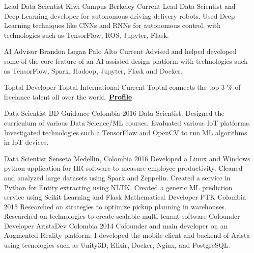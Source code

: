 \begin{cventries}

  \cventry
    {Lead Data Scientist}
    {Kiwi Campus}
    {Berkeley}
    {Current}
    {
    Lead Data Scientist and Deep Learning developer for autonomous driving delivery robots. Used
    Deep Learning techniques like CNNs and RNNs for autonomous control,
    with technologies such as TensorFlow, ROS, Jupyter, Flask.
    }

  \cventry
    {AI Advisor}
    {Brandon Logan}
    {Palo Alto}
    {Current}
    {
    Advised and helped developed some of the core feature of an AI-assisted design platform
    with technologies such as TensorFlow, Spark, Hadoop, Jupyter, Flask and Docker.
    }

  \cventry
    {Toptal Developer }
    {Toptal}
    {International}
    { Current}
    {
      Toptal connects the top 3 \% of freelance talent all over the world. \href{https://www.toptal.com/resume/cristian-garcia}{\textbf{Profile}}
    }

  \cventry
    {Data Scientist}
    {BD Guidance}
    {Colombia}
    {2016}
    {
    Data Scientist: Designed the curriculum of various
    Data Science/ML courses. Evaluated various IoT platforms. Investigated
    technologies such a TensorFlow and OpenCV to run ML algorithms in IoT
    devices.
    }

  \cventry
    {Data Scientist}
    {Senseta}
    {Medellin, Colombia}
    {2016}
    {
    Developed a Linux and Windows python
    application for HR software to measure employee productivity. Cleaned
    and analyzed large datasets using Spark and Zeppelin. Created a service in
    Python for Entity extracting using NLTK. Created a generic ML prediction
    service using Scikit Learning and Flask
    }
  \cventry
    {Mathematical Developer}
    {PTK}
    {Colombia}
    {2015}
    {
    Researched on strategies to optimize
    pickup planning in warehouses. Researched on technologies to create
    scalable multi-tenant software
    }
  \cventry
    {Cofounder - Developer}
    {AristaDev}
    {Colombia}
    {2014 }
    {
    Cofounder and main developer on an
    Augmented Reality platform. I developed the mobile client and backend
    of Arista using tecnologies such as Unity3D, Elixir, Docker, Nginx, and
    PostgreSQL.
    }
\end{cventries}
